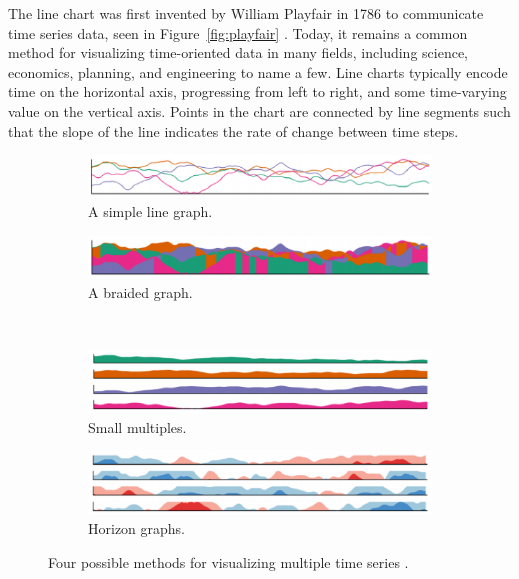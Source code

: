 The line chart was first invented by William Playfair in 1786 to communicate time series data, seen in Figure~\ref{fig:playfair} \cite{playfair}.  Today, it remains a common method for visualizing time-oriented data in many fields, including science, economics, planning, and engineering to name a few.  Line charts typically encode time on the horizontal axis, progressing from left to right, and some time-varying value on the vertical axis.  Points in the chart are connected by line segments such that the slope of the line indicates the rate of change between time steps.  

\begin{figure}
	\centering
	\begin{subfigure}[b]{0.45\textwidth}
		\includegraphics[width=\textwidth]{figures/eps/ts_simplelinegraph.eps}
		\caption{A simple line graph.}
		\label{fig:ts_simple}
	\end{subfigure}
	\begin{subfigure}[b]{0.45\textwidth}
		\includegraphics[width=\textwidth]{figures/eps/ts_braidedgraph.eps}
		\caption{A braided graph.}
		\label{fig:ts_braid}
	\end{subfigure}
	\\
	\begin{subfigure}[b]{0.45\textwidth}
		\includegraphics[width=\textwidth]{figures/eps/ts_smallmultiples.eps}
		\caption{Small multiples.}
		\label{fig:ts_smmult}
	\end{subfigure}
	\begin{subfigure}[b]{0.45\textwidth}
		\includegraphics[width=\textwidth]{figures/eps/ts_horizongraphs.eps}
		\caption{Horizon graphs.}
		\label{fig:ts_horizon}
	\end{subfigure}
	\caption{Four possible methods for visualizing multiple time series \cite{javed2010}.}
	\label{fig:ts_compare}
\end{figure}

